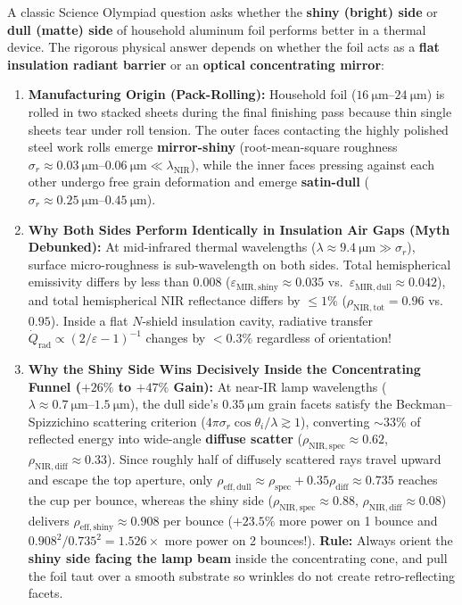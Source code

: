 \begin{devicebox}
A classic Science Olympiad question asks whether the \textbf{shiny (bright) side} or \textbf{dull (matte) side} of household aluminum foil performs better in a thermal device. The rigorous physical answer depends on whether the foil acts as a \textbf{flat insulation radiant barrier} or an \textbf{optical concentrating mirror}:
\begin{enumerate}
  \item \textbf{Manufacturing Origin (Pack-Rolling):} Household foil ($\SIrange{16}{24}{\micro\meter}$) is rolled in two stacked sheets during the final finishing pass because thin single sheets tear under roll tension. The outer faces contacting the highly polished steel work rolls emerge \textbf{mirror-shiny} (root-mean-square roughness $\sigma_r \approx \SIrange{0.03}{0.06}{\micro\meter} \ll \lambda_{\mathrm{NIR}}$), while the inner faces pressing against each other undergo free grain deformation and emerge \textbf{satin-dull} ($\sigma_r \approx \SIrange{0.25}{0.45}{\micro\meter}$).
  \item \textbf{Why Both Sides Perform Identically in Insulation Air Gaps (Myth Debunked):} At mid-infrared thermal wavelengths ($\lambda \approx \SI{9.4}{\micro\meter} \gg \sigma_r$), surface micro-roughness is sub-wavelength on both sides. Total hemispherical emissivity differs by less than $0.008$ ($\varepsilon_{\mathrm{MIR,shiny}} \approx 0.035$ vs.\ $\varepsilon_{\mathrm{MIR,dull}} \approx 0.042$), and total hemispherical NIR reflectance differs by $\le 1\%$ ($\rho_{\mathrm{NIR,tot}} = 0.96$ vs.\ $0.95$). Inside a flat $N$-shield insulation cavity, radiative transfer $\dot{Q}_{\mathrm{rad}} \propto (2/\varepsilon - 1)^{-1}$ changes by $< 0.3\%$ regardless of orientation!
  \item \textbf{Why the Shiny Side Wins Decisively Inside the Concentrating Funnel ($+26\%$ to $+47\%$ Gain):} At near-IR lamp wavelengths ($\lambda \approx \SIrange{0.7}{1.5}{\micro\meter}$), the dull side's $\SI{0.35}{\micro\meter}$ grain facets satisfy the Beckman--Spizzichino scattering criterion ($4\pi\sigma_r\cos\theta_i/\lambda \gtrsim 1$), converting $\sim 33\%$ of reflected energy into wide-angle \textbf{diffuse scatter} ($\rho_{\mathrm{NIR,spec}} \approx 0.62$, $\rho_{\mathrm{NIR,diff}} \approx 0.33$). Since roughly half of diffusely scattered rays travel upward and escape the top aperture, only $\rho_{\mathrm{eff,dull}} \approx \rho_{\mathrm{spec}} + 0.35\rho_{\mathrm{diff}} \approx 0.735$ reaches the cup per bounce, whereas the shiny side ($\rho_{\mathrm{NIR,spec}} \approx 0.88$, $\rho_{\mathrm{NIR,diff}} \approx 0.08$) delivers $\rho_{\mathrm{eff,shiny}} \approx 0.908$ per bounce ($+23.5\%$ more power on 1 bounce and $0.908^2/0.735^2 = \mathbf{1.526\times}$ more power on 2 bounces!). \textbf{Rule:} Always orient the \textbf{shiny side facing the lamp beam} inside the concentrating cone, and pull the foil taut over a smooth substrate so wrinkles do not create retro-reflecting facets.

\end{enumerate}
\end{devicebox}
